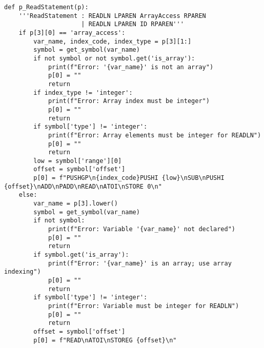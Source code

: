 \documentclass[12pt,a4paper]{report}%
\begin{document}
\begin{lstlisting}[style=pythonStyle, caption={Ficheiro lex.py}]
def p_ReadStatement(p):
    '''ReadStatement : READLN LPAREN ArrayAccess RPAREN
                     | READLN LPAREN ID RPAREN'''
    if p[3][0] == 'array_access':
        var_name, index_code, index_type = p[3][1:]
        symbol = get_symbol(var_name)
        if not symbol or not symbol.get('is_array'):
            print(f"Error: '{var_name}' is not an array")
            p[0] = ""
            return
        if index_type != 'integer':
            print(f"Error: Array index must be integer")
            p[0] = ""
            return
        if symbol['type'] != 'integer':
            print(f"Error: Array elements must be integer for READLN")
            p[0] = ""
            return
        low = symbol['range'][0]
        offset = symbol['offset']
        p[0] = f"PUSHGP\n{index_code}PUSHI {low}\nSUB\nPUSHI {offset}\nADD\nPADD\nREAD\nATOI\nSTORE 0\n"
    else:
        var_name = p[3].lower()
        symbol = get_symbol(var_name)
        if not symbol:
            print(f"Error: Variable '{var_name}' not declared")
            p[0] = ""
            return
        if symbol.get('is_array'):
            print(f"Error: '{var_name}' is an array; use array indexing")
            p[0] = ""
            return
        if symbol['type'] != 'integer':
            print(f"Error: Variable must be integer for READLN")
            p[0] = ""
            return
        offset = symbol['offset']
        p[0] = f"READ\nATOI\nSTOREG {offset}\n"


\end{lstlisting}
\end{document}
